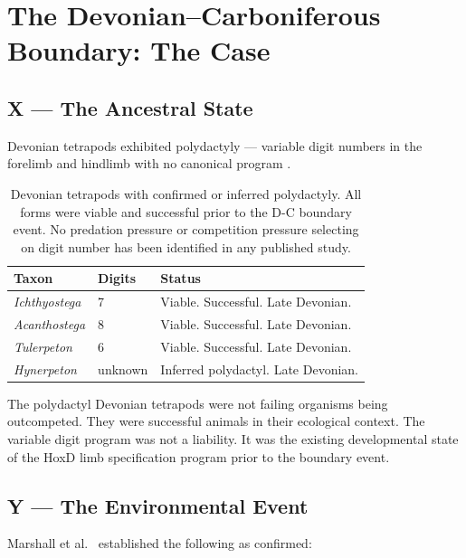 \documentclass[11pt, a4paper]{article}
\begin{document}
\section{The Devonian--Carboniferous Boundary:
The Case}

\subsection{X --- The Ancestral State}

Devonian tetrapods exhibited polydactyly ---
variable digit numbers in the forelimb and
hindlimb with no canonical program
\cite{clack2012}.

\begin{table}[h]
\centering
\small
\begin{tabularx}{\linewidth}{p{3.5cm}p{1.5cm}X}
\toprule
\textbf{Taxon} & \textbf{Digits} &
\textbf{Status} \\
\midrule
\textit{Ichthyostega} & 7 &
  Viable. Successful. Late Devonian. \\[0.2em]
\textit{Acanthostega} & 8 &
  Viable. Successful. Late Devonian. \\[0.2em]
\textit{Tulerpeton} & 6 &
  Viable. Successful. Late Devonian. \\[0.2em]
\textit{Hynerpeton} & unknown &
  Inferred polydactyl. Late Devonian. \\
\bottomrule
\end{tabularx}
\caption{Devonian tetrapods with confirmed or
  inferred polydactyly. All forms were viable
  and successful prior to the D-C boundary event.
  No predation pressure or competition pressure
  selecting on digit number has been identified
  in any published study.}
\end{table}

The polydactyl Devonian tetrapods were not failing
organisms being outcompeted.
They were successful animals in their ecological
context.
The variable digit program was not a liability.
It was the existing developmental state of the
HoxD limb specification program prior to the
boundary event.

\subsection{Y --- The Environmental Event}

Marshall et al.\ \cite{marshall2020} established
the following as confirmed:
\end{document}
